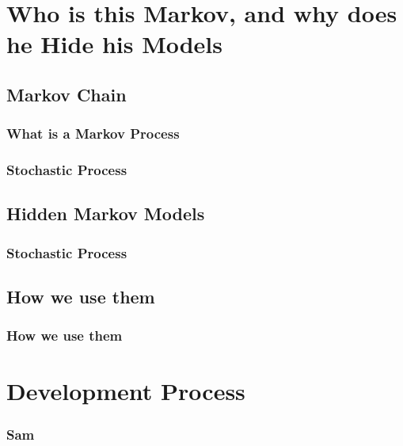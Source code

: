 \documentclass{beamer}
\begin{document}
\section{Who is this Markov, and why does he Hide his Models}

\subsection{Markov Chain}

\begin{frame}
   \frametitle{What is a Markov Process}
\end{frame}

\begin{frame}
   \frametitle{}
\end{frame}

\begin{frame}
   \frametitle{Stochastic Process}
\end{frame}

\subsection{Hidden Markov Models}
\begin{frame}
   \frametitle{}
\end{frame}

\begin{frame}
   \frametitle{Stochastic Process}
\end{frame}

\subsection{How we use them}
\begin{frame}
   \frametitle{How we use them}
\end{frame}

\section{Development Process}

\begin{frame}
   \frametitle{Sam}
\end{frame}
\end{document}
